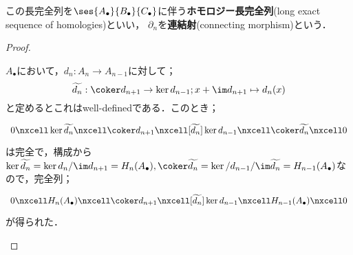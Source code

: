 この長完全列を$\ses{A_\bullet}{B_\bullet}{C_\bullet}$に伴う\textbf{ホモロジー長完全列}(long exact sequence of homologies)といい， $\partial_n$を\textbf{連結射}(connecting morphism)という．

\begin{proof}
	\begin{step}
		\item 
		
		$A_\bullet$において，$d_n:A_n\to A_{n-1}$に対して；
		\[\widetilde{d_n}:\coker d_{n+1}\to\ker d_{n-1};x+\im d_{n+1}\mapsto d_n(x)\]
		と定めるとこれはwell-definedである．このとき；
		\[\begin{tikzcd}
		0\nxcell\ker\widetilde{d_n}\nxcell\coker d_{n+1}\nxcell[\widetilde{d_n}]\ker d_{n-1}\nxcell\coker\widetilde{d_n}\nxcell0
		\end{tikzcd}\]
		は完全で，構成から$\ker\widetilde{d_n}=\ker d_n/\im d_{n+1}=H_n(A_\bullet),\coker\widetilde{d_n}=\ker/d_{n-1}/\im\widetilde{d_n}=H_{n-1}(A_\bullet)$なので，完全列；
		\[\begin{tikzcd}
		0\nxcell H_n(A_\bullet)\nxcell\coker d_{n+1}\nxcell[\widetilde{d_n}]\ker d_{n-1}\nxcell H_{n-1}(A_\bullet)\nxcell0
		\end{tikzcd}\]
		が得られた．
		
		\item 
		

\end{step}
\end{proof}

